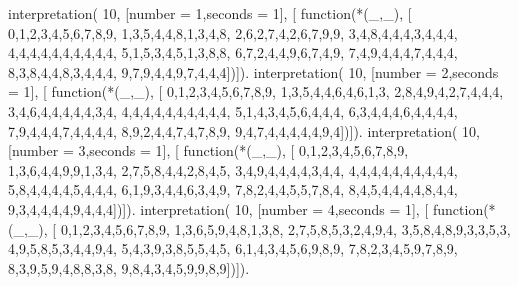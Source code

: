 interpretation( 10, [number = 1,seconds = 1], [
    function(*(_,_), [
        0,1,2,3,4,5,6,7,8,9,
        1,3,5,4,4,8,1,3,4,8,
        2,6,2,7,4,2,6,7,9,9,
        3,4,8,4,4,4,3,4,4,4,
        4,4,4,4,4,4,4,4,4,4,
        5,1,5,3,4,5,1,3,8,8,
        6,7,2,4,4,9,6,7,4,9,
        7,4,9,4,4,4,7,4,4,4,
        8,3,8,4,4,8,3,4,4,4,
        9,7,9,4,4,9,7,4,4,4])]).
interpretation( 10, [number = 2,seconds = 1], [
    function(*(_,_), [
        0,1,2,3,4,5,6,7,8,9,
        1,3,5,4,4,6,4,6,1,3,
        2,8,4,9,4,2,7,4,4,4,
        3,4,6,4,4,4,4,4,3,4,
        4,4,4,4,4,4,4,4,4,4,
        5,1,4,3,4,5,6,4,4,4,
        6,3,4,4,4,6,4,4,4,4,
        7,9,4,4,4,7,4,4,4,4,
        8,9,2,4,4,7,4,7,8,9,
        9,4,7,4,4,4,4,4,9,4])]).
interpretation( 10, [number = 3,seconds = 1], [
    function(*(_,_), [
        0,1,2,3,4,5,6,7,8,9,
        1,3,6,4,4,9,9,1,3,4,
        2,7,5,8,4,4,2,8,4,5,
        3,4,9,4,4,4,4,3,4,4,
        4,4,4,4,4,4,4,4,4,4,
        5,8,4,4,4,4,5,4,4,4,
        6,1,9,3,4,4,6,3,4,9,
        7,8,2,4,4,5,5,7,8,4,
        8,4,5,4,4,4,4,8,4,4,
        9,3,4,4,4,4,9,4,4,4])]).
interpretation( 10, [number = 4,seconds = 1], [
    function(*(_,_), [
        0,1,2,3,4,5,6,7,8,9,
        1,3,6,5,9,4,8,1,3,8,
        2,7,5,8,5,3,2,4,9,4,
        3,5,8,4,8,9,3,3,5,3,
        4,9,5,8,5,3,4,4,9,4,
        5,4,3,9,3,8,5,5,4,5,
        6,1,4,3,4,5,6,9,8,9,
        7,8,2,3,4,5,9,7,8,9,
        8,3,9,5,9,4,8,8,3,8,
        9,8,4,3,4,5,9,9,8,9])]).
